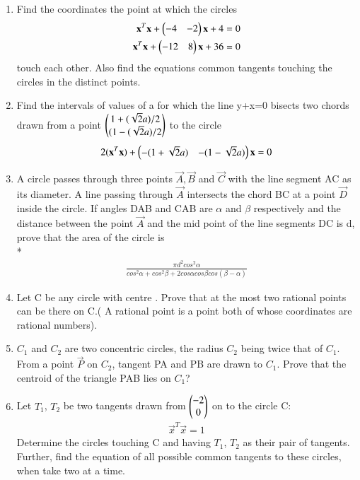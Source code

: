 \begin{enumerate}[label=\arabic*.,ref=\thesubsection.\theenumi]
\item Find the coordinates the point at which the circles 
\begin{align}
\mathbf{x}^T\mathbf{x}+\begin{pmatrix}-4&-2\end{pmatrix}\mathbf{x}+4=0 \\
\mathbf{x}^T\mathbf{x}+\begin{pmatrix}-12&8\end{pmatrix}\mathbf{x}+36=0
\end{align}
touch each other. Also find the equations common tangents touching the circles in the distinct points.
 
\item Find the intervals of values of a for which the line y+x=0 bisects two chords drawn from a point  $\begin{pmatrix}1+(\sqrt{2}a)/2 \\ (1-(\sqrt{2}a)/2 \end{pmatrix}$ to the circle 
\begin{align}
2(\mathbf{x}^T\mathbf{x})+\begin{pmatrix}-(1+\sqrt{2}a)&-(1-\sqrt{2}a)\end{pmatrix}\mathbf{x}=0
\end{align}
    
\item A circle passes through three points $\vec{A},\vec{B}$ and $\vec{C}$ with the line segment AC as its diameter. A line passing through $\vec{A}$ intersects the chord BC at a point $\vec{D}$ inside the circle. If angles DAB and CAB are $\alpha$ and $\beta$ respectively and the distance between the point $\vec{A}$ and the mid point of the line segments DC is d, prove that the area of the circle is \\*
\begin{align}
\frac{\pi d^2 cos^2 \alpha}{cos^2\alpha + cos^2\beta +2 cos\alpha cos \beta cos(\beta-\alpha)}
\end{align}
    
\item Let C be any circle with centre . Prove that at the most two rational points can be there on C.( A rational point is a point both of whose coordinates are rational numbers).

\item $C_1$ and $C_2$ are two concentric circles, the radius $C_2$ being twice that of $C_1$. From a point $\vec{P}$ on  $C_2$, tangent PA and PB are drawn to $C_1$. Prove that the centroid of the triangle PAB lies on $C_1$?
    
\item Let $T_1$, $T_2$ be two tangents drawn from $\begin{pmatrix}-2 \\ 0\end{pmatrix}$ on to the circle C: 
\begin{align}
\vec{x}^T\vec{x}=1
\end{align} 
Determine the circles touching C and having $T_1$, $T_2$  as their pair of tangents. Further, find the equation of all possible common tangents to these circles, when take two at a time.


\end{enumerate}
